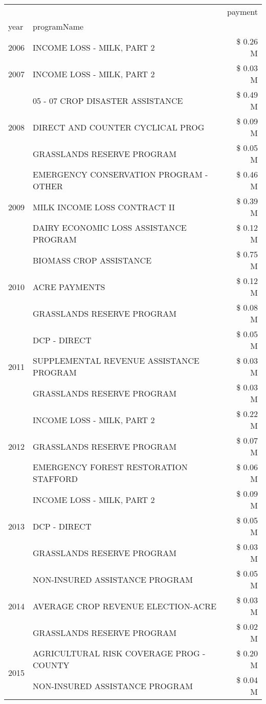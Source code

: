 \begin{tabular}{llr}
\toprule
 &  & payment \\
year & programName &  \\
\midrule
2006 & INCOME LOSS - MILK, PART 2 & \$ 0.26 M \\
\cline{1-3}
2007 & INCOME LOSS - MILK, PART 2 & \$ 0.03 M \\
\cline{1-3}
\multirow[t]{3}{*}{2008} & 05 - 07 CROP DISASTER ASSISTANCE & \$ 0.49 M \\
 & DIRECT AND COUNTER CYCLICAL PROG & \$ 0.09 M \\
 & GRASSLANDS RESERVE PROGRAM & \$ 0.05 M \\
\cline{1-3}
\multirow[t]{3}{*}{2009} & EMERGENCY CONSERVATION PROGRAM - OTHER & \$ 0.46 M \\
 & MILK INCOME LOSS CONTRACT II & \$ 0.39 M \\
 & DAIRY ECONOMIC LOSS ASSISTANCE PROGRAM & \$ 0.12 M \\
\cline{1-3}
\multirow[t]{3}{*}{2010} & BIOMASS CROP ASSISTANCE & \$ 0.75 M \\
 & ACRE PAYMENTS & \$ 0.12 M \\
 & GRASSLANDS RESERVE PROGRAM & \$ 0.08 M \\
\cline{1-3}
\multirow[t]{3}{*}{2011} & DCP - DIRECT & \$ 0.05 M \\
 & SUPPLEMENTAL REVENUE ASSISTANCE PROGRAM & \$ 0.03 M \\
 & GRASSLANDS RESERVE PROGRAM & \$ 0.03 M \\
\cline{1-3}
\multirow[t]{3}{*}{2012} & INCOME LOSS - MILK, PART 2 & \$ 0.22 M \\
 & GRASSLANDS RESERVE PROGRAM & \$ 0.07 M \\
 & EMERGENCY FOREST RESTORATION STAFFORD & \$ 0.06 M \\
\cline{1-3}
\multirow[t]{3}{*}{2013} & INCOME LOSS - MILK, PART 2 & \$ 0.09 M \\
 & DCP - DIRECT & \$ 0.05 M \\
 & GRASSLANDS RESERVE PROGRAM & \$ 0.03 M \\
\cline{1-3}
\multirow[t]{3}{*}{2014} & NON-INSURED ASSISTANCE PROGRAM & \$ 0.05 M \\
 & AVERAGE CROP REVENUE ELECTION-ACRE & \$ 0.03 M \\
 & GRASSLANDS RESERVE PROGRAM & \$ 0.02 M \\
\cline{1-3}
\multirow[t]{3}{*}{2015} & AGRICULTURAL RISK COVERAGE PROG - COUNTY & \$ 0.20 M \\
 & NON-INSURED ASSISTANCE PROGRAM & \$ 0.04 M \\

\end{tabular}
